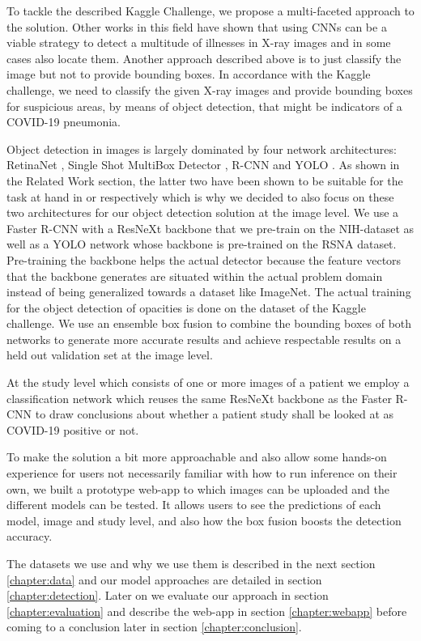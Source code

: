 To tackle the described Kaggle Challenge, we propose a multi-faceted approach to the solution. Other works in this field have shown that using \acp{CNN} can be a viable strategy to detect a multitude of illnesses in X-ray images and in some cases also locate them. Another approach described above is to just classify the image but not to provide bounding boxes. In accordance with the Kaggle challenge, we need to classify the given X-ray images and provide bounding boxes for suspicious areas, by means of object detection, that might be indicators of a COVID-19 pneumonia.

Object detection in images is largely dominated by four network architectures: RetinaNet \autocite{lin_focal_2018}, Single Shot MultiBox Detector \autocite{liu_ssd_2016}, \acl{R-CNN} \autocite{girshick_rich_2014} and \ac{YOLO} \autocite{yoloOriginal}. As shown in the Related Work section, the latter two have been shown to be suitable for the task at hand in \autocite{podder_efficient_2021} or \autocite{al2021fast} respectively which is why we decided to also focus on these two architectures for our object detection solution at the image level. We use a Faster \acs{R-CNN} with a ResNeXt backbone that we pre-train on the NIH-dataset as well as a \acs{YOLO} network whose backbone is pre-trained on the RSNA dataset. Pre-training the backbone helps the actual detector because the feature vectors that the backbone generates are situated within the actual problem domain instead of being generalized towards a dataset like ImageNet. The actual training for the object detection of opacities is done on the dataset of the Kaggle challenge. We use an ensemble box fusion to combine the bounding boxes of both networks to generate more accurate results and achieve respectable results on a held out validation set at the image level.

At the study level which consists of one or more images of a patient we employ a classification network which reuses the same ResNeXt backbone as the Faster \ac{R-CNN} to draw conclusions about whether a patient study shall be looked at as COVID-19 positive or not.

To make the solution a bit more approachable and also allow some hands-on experience for users not necessarily familiar with how to run inference on their own, we built a prototype web-app to which images can be uploaded and the different models can be tested. It allows users to see the predictions of each model, image and study level, and also how the box fusion boosts the detection accuracy. 

The datasets we use and why we use them is described in the next section \vref{chapter:data} and our model approaches are detailed in section \vref{chapter:detection}. Later on we evaluate our approach in section \vref{chapter:evaluation} and describe the web-app in section \vref{chapter:webapp} before coming to a conclusion later in section \vref{chapter:conclusion}.